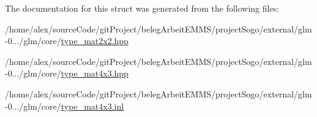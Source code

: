 The documentation for this struct was generated from the following files\-:\begin{DoxyCompactItemize}
\item 
/home/alex/source\-Code/git\-Project/beleg\-Arbeit\-E\-M\-M\-S/project\-Sogo/external/glm-\/0.../glm/core/\hyperlink{type__mat2x2_8hpp}{type\-\_\-mat2x2.\-hpp}\item 
/home/alex/source\-Code/git\-Project/beleg\-Arbeit\-E\-M\-M\-S/project\-Sogo/external/glm-\/0.../glm/core/\hyperlink{type__mat4x3_8hpp}{type\-\_\-mat4x3.\-hpp}\item 
/home/alex/source\-Code/git\-Project/beleg\-Arbeit\-E\-M\-M\-S/project\-Sogo/external/glm-\/0.../glm/core/\hyperlink{type__mat4x3_8inl}{type\-\_\-mat4x3.\-inl}\end{DoxyCompactItemize}
